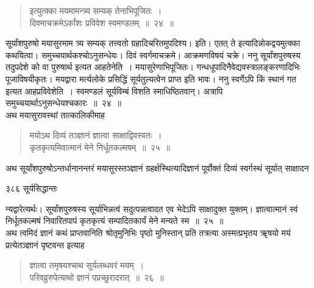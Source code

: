 \documentclass[11pt, openany]{book}
\begin{document}

\begin{quote}
 {\ssi इत्युत्क्का मयमामन्त्र्य सम्यक् तेनाभिपूजितः~।\\
दिवमाचक्रमेऽर्कांशः प्रविवेश स्वमण्डलम्~॥~२४~॥ }
\end{quote}

 सूर्यांशपुरुषो मयासुरमाम त्र्य सम्यक् तत्त्वतो ग्रहादिचरितमुपदिश्य। इति। एतत् ते इत्यादिन्नोकद्वयमुत्क्का कथयित्वा। समुच्चयार्थकश्चोऽनुसन्धेयः। दिवं स्वर्गमाचक्रमे। आक्रमणविषयं चक्रे। ननु सूर्यांशपुरुषस्य तदुपदेशे को वा पुरुषार्थ इत्यत आह\textendash तेनेति~। मयासुरेणाभिपूजितः। गन्धधूपादिनैवेद्यवस्त्रालङ्करणादिभिः पूजाविषयीकृतः। मयद्वारा मर्त्यलोके प्रसिद्धिं सूर्यतुल्यत्वेन प्राप्त इति भावः। ननु स्वर्गेऽपि किं स्थानं गत इत्यत आह\textendash प्रविवेशेति~। स्वमण्डलं सूर्यविम्बं विशति स्माधिष्ठितवान्। अत्रापि समुच्चयार्थाऽनुसन्धेयश्चकारः~॥~२४~॥\\
 \noindent अथ मयासुरावस्थां तात्कालिकीमाह\textendash


\begin{quote}
 {\ssi मयोऽथ दिव्यं तञ्ज्ञानं ज्ञात्वा साक्षाद्विवस्वतः~।\\
कृतकृत्यमिवात्मानं मेने निर्धूतकल्मषम्~॥~२५~॥}
\end{quote}

 अथ सूर्यांशपुरुषोऽन्तर्धानानन्तरं मयासुरस्तञ्ज्ञानं ग्रहर्क्षस्थित्यादिज्ञानं पूर्वोक्तं दिव्यं स्वर्गस्थं सूर्यात् साक्षादन\textendash



\newpage


\noindent ३८६ \hspace{4cm} सूर्यसिद्धान्तः
\vspace{1cm}


\noindent न्यद्वारेत्यर्थः। सूर्यांशपुरुषस्य सूर्याभिन्नत्वं सदुत्पन्नत्वादत एव भेदेऽपि साक्षादुक्त युक्तम्। ज्ञात्वात्मानं स्वं निर्धूतकल्मषं निवारितपापं कृतकृत्यं सम्पादितकार्यं मेने मन्यते स्म~॥~२५~॥\\
\noindent अथ त्वमिदं ज्ञानं कथं प्राप्तवानिति श्रोतृमुनिभिः पृष्ठो मुनिस्तान् प्रति तत्रत्या अस्मत्प्रभृतय ॠषयो मयं प्रत्येतञ्ज्ञानं पृष्टवन्त इत्याह\textendash 


\begin{quote}
 {\ssi ज्ञात्वा तमृषयश्चाथ सूर्यलब्धवरं मयम्~।\\
परिवव्रुरुपेत्याथो ज्ञानं पप्रच्छुरादरात्~॥~२६~॥ }
\end{quote}
\end{document}
